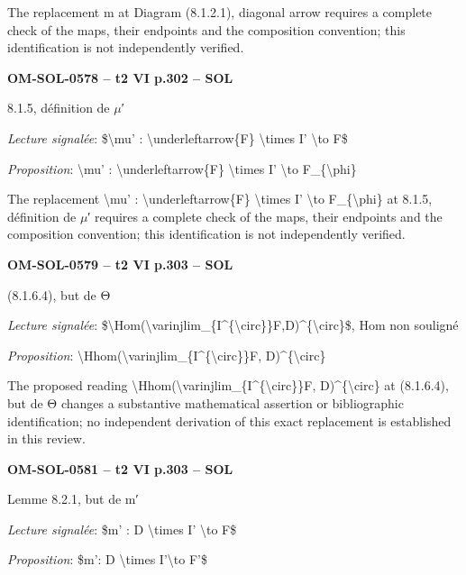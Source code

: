 The replacement m at Diagram (8.1.2.1), diagonal arrow requires a complete check of the maps, their endpoints and the composition convention; this identification is not independently verified.\par
\par\noindent\textbf{OM-SOL-0578 -- t2 VI p.302 -- SOL}\par
8.1.5, définition de \ensuremath{\mu}′\par
\emph{Lecture signalée}: \$\textbackslash{}mu' : \textbackslash{}underleftarrow\{F\} \textbackslash{}times I' \textbackslash{}to F\$\par
\emph{Proposition}: \textbackslash{}mu' : \textbackslash{}underleftarrow\{F\} \textbackslash{}times I' \textbackslash{}to F\_\{\textbackslash{}phi\}\par
The replacement \textbackslash{}mu' : \textbackslash{}underleftarrow\{F\} \textbackslash{}times I' \textbackslash{}to F\_\{\textbackslash{}phi\} at 8.1.5, définition de \ensuremath{\mu}′ requires a complete check of the maps, their endpoints and the composition convention; this identification is not independently verified.\par
\par\noindent\textbf{OM-SOL-0579 -- t2 VI p.303 -- SOL}\par
(8.1.6.4), but de Θ\par
\emph{Lecture signalée}: \$\textbackslash{}Hom(\textbackslash{}varinjlim\_\{I\textasciicircum{}\{\textbackslash{}circ\}\}F,D)\textasciicircum{}\{\textbackslash{}circ\}\$, Hom non souligné\par
\emph{Proposition}: \textbackslash{}Hhom(\textbackslash{}varinjlim\_\{I\textasciicircum{}\{\textbackslash{}circ\}\}F, D)\textasciicircum{}\{\textbackslash{}circ\}\par
The proposed reading \textbackslash{}Hhom(\textbackslash{}varinjlim\_\{I\textasciicircum{}\{\textbackslash{}circ\}\}F, D)\textasciicircum{}\{\textbackslash{}circ\} at (8.1.6.4), but de Θ changes a substantive mathematical assertion or bibliographic identification; no independent derivation of this exact replacement is established in this review.\par
\par\noindent\textbf{OM-SOL-0581 -- t2 VI p.303 -- SOL}\par
Lemme 8.2.1, but de m′\par
\emph{Lecture signalée}: \$m' : D \textbackslash{}times I' \textbackslash{}to F\$\par
\emph{Proposition}: \$m': D \textbackslash{}times I'\textbackslash{}to F'\$\par
